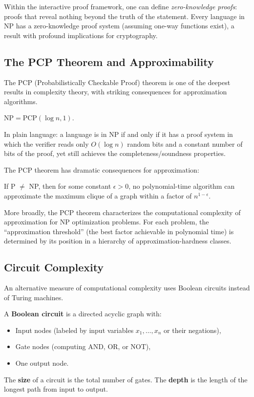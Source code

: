 Within the interactive proof framework, one can define \emph{zero-knowledge proofs}: proofs that reveal nothing beyond the truth of the statement. Every language in NP has a zero-knowledge proof system (assuming one-way functions exist), a result with profound implications for cryptography.

\subsection{The PCP Theorem and Approximability}

The PCP (Probabilistically Checkable Proof) theorem is one of the deepest results in complexity theory, with striking consequences for approximation algorithms.

\begin{theorem}
$\text{NP} = \text{PCP}(\log n, 1)$.
\end{theorem}

In plain language: a language is in NP if and only if it has a proof system in which the verifier reads only $O(\log n)$ random bits and a constant number of bits of the proof, yet still achieves the completeness/soundness properties.

The PCP theorem has dramatic consequences for approximation:

\begin{theorem}
If P $\neq$ NP, then for some constant $\epsilon > 0$, no polynomial-time algorithm can approximate the maximum clique of a graph within a factor of $n^{1-\epsilon}$.
\end{theorem}

More broadly, the PCP theorem characterizes the computational complexity of approximation for NP optimization problems. For each problem, the ``approximation threshold'' (the best factor achievable in polynomial time) is determined by its position in a hierarchy of approximation-hardness classes.

\subsection{Circuit Complexity}

An alternative measure of computational complexity uses Boolean circuits instead of Turing machines.

\begin{definition}
A \textbf{Boolean circuit} is a directed acyclic graph with:
\begin{itemize}
  \item Input nodes (labeled by input variables $x_1, \ldots, x_n$ or their negations),
  \item Gate nodes (computing AND, OR, or NOT),
  \item One output node.
\end{itemize}
The \textbf{size} of a circuit is the total number of gates. The \textbf{depth} is the length of the longest path from input to output.
\end{definition}

